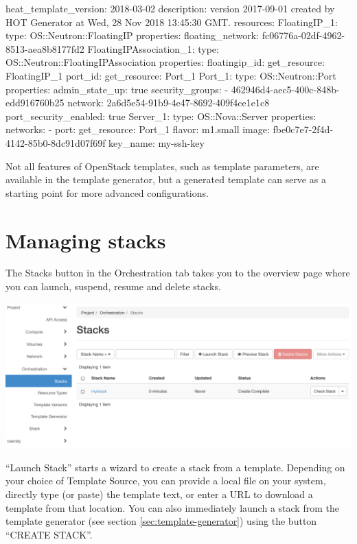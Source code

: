 \begin{code}{}
heat_template_version: 2018-03-02
description: version 2017-09-01 created by HOT Generator at Wed, 28 Nov 2018 13:45:30 GMT.
resources:
  FloatingIP_1:
    type: OS::Neutron::FloatingIP
    properties:
      floating_network: fc06776a-02df-4962-8513-aea8b8177fd2
  FloatingIPAssociation_1:
    type: OS::Neutron::FloatingIPAssociation
    properties:
      floatingip_id: { get_resource: FloatingIP_1 }
      port_id: { get_resource: Port_1 }
  Port_1:
    type: OS::Neutron::Port
    properties:
      admin_state_up: true
      security_groups:
        - 462946d4-aec5-400c-848b-edd916760b25
      network: 2a6d5e54-91b9-4e47-8692-409f4ce1e1c8
      port_security_enabled: true
  Server_1:
    type: OS::Nova::Server
    properties:
      networks:
        - port: { get_resource: Port_1 }
      flavor: m1.small
      image: fbe0c7e7-2f4d-4142-85b0-8dc91d07f69f
      key_name: my-ssh-key
\end{code}

Not all features of OpenStack templates, such as template parameters,
are available in the template generator, but a generated template can
serve as a starting point for more advanced configurations.

\section{Managing stacks}
The Stacks button in the Orchestration tab takes you to the overview
page where you can launch, suspend, resume and delete stacks.
\begin{center}
  \includegraphics[width=\textwidth]{img/stacks_overview}
\end{center}

``Launch Stack'' starts a wizard to create a stack from a template.
Depending on your choice of Template Source, you can provide a local
file on your system, directly type (or paste) the template text, or
enter a URL to download a template from that location.  You can also
immediately launch a stack from the template generator (see section
\ref{sec:template-generator}) using the button ``CREATE STACK''.

